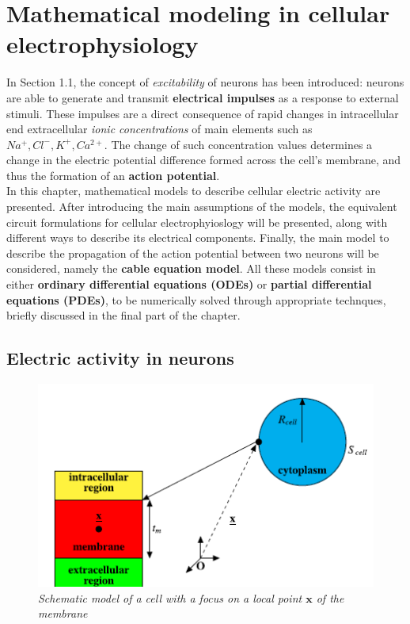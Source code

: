 \documentclass[a4paper]{article}
\begin{document}
	
	
	
\section{Mathematical modeling in cellular electrophysiology}

In Section 1.1, the concept of \textit{excitability} of neurons has been introduced: neurons are able to generate and transmit \textbf{electrical impulses} as a response to external stimuli. These impulses are a direct consequence of rapid changes in intracellular end extracellular \textit{ionic concentrations} of main elements such as $Na^+, Cl^-, K^+, Ca^{2+}$. The change of such concentration values determines a change in the electric potential difference formed across the cell's membrane, and thus the formation of an \textbf{action potential}. \\
In this chapter, mathematical models to describe cellular electric activity are presented. After introducing the main assumptions of the models, the equivalent circuit formulations for cellular electrophyioslogy will be presented, along with different ways to describe its electrical components. Finally, the main model to describe the propagation of the action potential between two neurons will be considered, namely the \textbf{cable equation model}. All these models consist in either \textbf{ordinary differential equations (ODEs)} or \textbf{partial differential equations (PDEs)}, to be numerically solved through appropriate technques, briefly discussed in the final part of the chapter.

\subsection{Electric activity in neurons}


\begin{figure}[H]
	\begin{center}
		\includegraphics[scale=0.77]{first.png} 
	\end{center} 
	\caption{\textit{Schematic model of a cell with a focus on a local point $\textbf{x}$ of the membrane}}
	
\end{figure}
\end{document}
